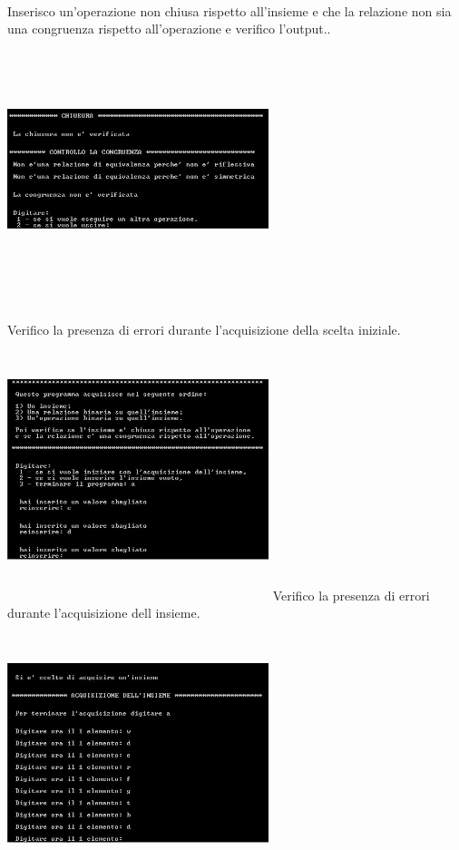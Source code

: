 ﻿\documentclass[11pt,a4paper,titlepage,block]{article}
\begin{document}
\\
\newpage
Inserisco un'operazione non chiusa rispetto all'insieme e che la relazione non sia una congruenza rispetto all'operazione e verifico l'output..\\
\includegraphics[width=3in,height=3in,viewport=0 0 300 300]{../Screenshots/Capture9.JPG}\\
\\
Verifico la presenza di errori durante l'acquisizione della scelta iniziale.\\
\includegraphics[width=3in,height=3in,viewport=0 0 300 300]{../Screenshots/Capture10.JPG}
\newpage
Verifico la presenza di errori durante l'acquisizione dell insieme.\\
\includegraphics[width=3in,height=3in,viewport=0 0 300 300]{../Screenshots/Capture11.JPG}\\
\end{document}
